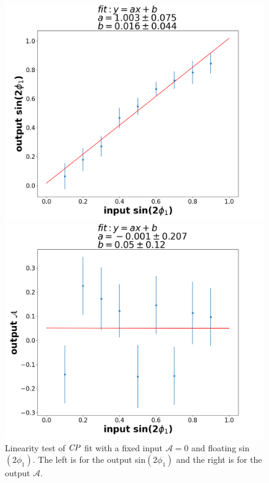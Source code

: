 \begin{figure}[htpb]
	\begin{minipage}{0.5\linewidth}
		\includegraphics[width=1\linewidth]{figures/S-test-line}
	\end{minipage}
	\begin{minipage}{0.5\linewidth}
		\includegraphics[width=1\linewidth]{figures/A-test-line}
	\end{minipage}
	\caption{Linearity test of $\it{CP}$ fit with a fixed input $\mathcal{A}=0$ and floating sin$(2\phi_1)$. The left is for the output sin$(2\phi_1)$ and the right is for the output $\mathcal{A}$.}
	\label{fig:cpfit_line_S}
\end{figure}
